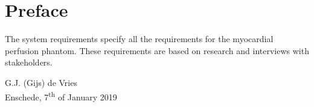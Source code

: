 \chapter*{Preface}

\vskip-10pt
The system requirements specify all the requirements for the myocardial perfusion phantom. These requirements are based on research and interviews with stakeholders.

\vskip50pt
G.J. (Gijs) de Vries\\
Enschede, 7\textsuperscript{th} of January 2019